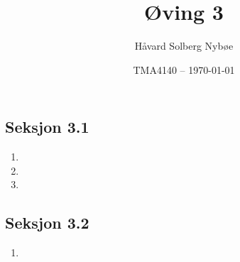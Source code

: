 \documentclass[a4paper, 12pt]{article}  %
\title{Øving 3}                         %
\author{Håvard Solberg Nybøe}           %
\date{TMA4140 -- \today}                %
\begin{document}
\maketitle

\subsection*{Seksjon 3.1}
\begin{enumerate}
    \item [\boxed{57}]
    \item [\boxed{59}]
    \item [\boxed{60}]
\end{enumerate}

\subsection*{Seksjon 3.2}
\begin{enumerate}
    \item [\boxed{27}]
\end{enumerate}

\end{document}

